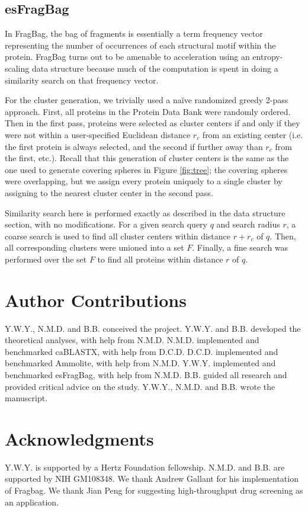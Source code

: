 \documentclass[review,preprint,12pt]{elsarticle}
\theoremstyle{definition}
\theoremstyle{remark}
\numberwithin{equation}{section}
\begin{document}
\subsection{esFragBag}
In FragBag, the bag of fragments is essentially
a term frequency vector representing the number of occurrences of each structural motif within the protein.
FragBag turns out to be amenable to acceleration using an entropy-scaling data structure because much of the computation is spent in doing a similarity search on that frequency vector.

For the cluster generation, we trivially used a na\"ive randomized greedy 2-pass approach.
First, all proteins in the Protein Data Bank were randomly ordered.
Then in the first pass, proteins were selected as cluster centers if and only if they were not within a user-specified Euclidean distance $r_c$ from an existing center (i.e. the first protein is always selected, and the second if further away than $r_c$ from the first, etc.).
Recall that this generation of cluster centers is the same as the one used to generate covering spheres in Figure \ref{fig:tree};
the covering spheres were overlapping, but we assign every protein uniquely to a single cluster by assigning to the nearest cluster center in the second pass.

Similarity search here is performed exactly as described in the data structure section, with no modifications.
For a given search query $q$ and search radius $r$,
a coarse search is used to find all cluster centers within distance $r+r_c$ of $q$.
Then, all corresponding clusters were unioned into a set $F$.
Finally, a fine search was performed over the set $F$ to find all proteins within distance $r$ of $q$.

\section{Author Contributions}
Y.W.Y., N.M.D. and B.B. conceived the project.
Y.W.Y. and B.B. developed the theoretical analyses, with help from N.M.D.
N.M.D. implemented and benchmarked caBLASTX, with help from D.C.D.
D.C.D. implemented and benchmarked Ammolite, with help from N.M.D.
Y.W.Y. implemented and benchmarked esFragBag, with help from N.M.D.
B.B. guided all research and provided critical advice on the study.
Y.W.Y., N.M.D. and B.B. wrote the manuscript.

\section{Acknowledgments}
Y.W.Y. is supported by a Hertz Foundation fellowship.
N.M.D. and B.B. are supported by NIH GM108348.
We thank Andrew Gallant for his implementation of Fragbag.
We thank Jian Peng for suggesting high-throughput drug screening as an application.


%

\end{document}
